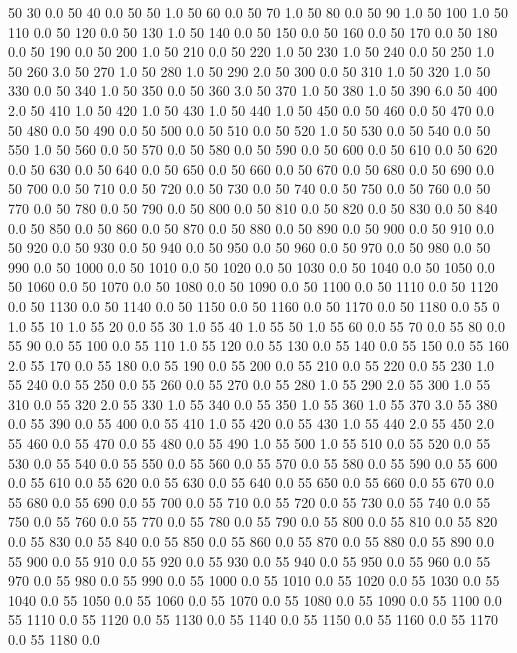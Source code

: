 50	30	0.0
50	40	0.0
50	50	1.0
50	60	0.0
50	70	1.0
50	80	0.0
50	90	1.0
50	100	1.0
50	110	0.0
50	120	0.0
50	130	1.0
50	140	0.0
50	150	0.0
50	160	0.0
50	170	0.0
50	180	0.0
50	190	0.0
50	200	1.0
50	210	0.0
50	220	1.0
50	230	1.0
50	240	0.0
50	250	1.0
50	260	3.0
50	270	1.0
50	280	1.0
50	290	2.0
50	300	0.0
50	310	1.0
50	320	1.0
50	330	0.0
50	340	1.0
50	350	0.0
50	360	3.0
50	370	1.0
50	380	1.0
50	390	6.0
50	400	2.0
50	410	1.0
50	420	1.0
50	430	1.0
50	440	1.0
50	450	0.0
50	460	0.0
50	470	0.0
50	480	0.0
50	490	0.0
50	500	0.0
50	510	0.0
50	520	1.0
50	530	0.0
50	540	0.0
50	550	1.0
50	560	0.0
50	570	0.0
50	580	0.0
50	590	0.0
50	600	0.0
50	610	0.0
50	620	0.0
50	630	0.0
50	640	0.0
50	650	0.0
50	660	0.0
50	670	0.0
50	680	0.0
50	690	0.0
50	700	0.0
50	710	0.0
50	720	0.0
50	730	0.0
50	740	0.0
50	750	0.0
50	760	0.0
50	770	0.0
50	780	0.0
50	790	0.0
50	800	0.0
50	810	0.0
50	820	0.0
50	830	0.0
50	840	0.0
50	850	0.0
50	860	0.0
50	870	0.0
50	880	0.0
50	890	0.0
50	900	0.0
50	910	0.0
50	920	0.0
50	930	0.0
50	940	0.0
50	950	0.0
50	960	0.0
50	970	0.0
50	980	0.0
50	990	0.0
50	1000	0.0
50	1010	0.0
50	1020	0.0
50	1030	0.0
50	1040	0.0
50	1050	0.0
50	1060	0.0
50	1070	0.0
50	1080	0.0
50	1090	0.0
50	1100	0.0
50	1110	0.0
50	1120	0.0
50	1130	0.0
50	1140	0.0
50	1150	0.0
50	1160	0.0
50	1170	0.0
50	1180	0.0
55	0	1.0
55	10	1.0
55	20	0.0
55	30	1.0
55	40	1.0
55	50	1.0
55	60	0.0
55	70	0.0
55	80	0.0
55	90	0.0
55	100	0.0
55	110	1.0
55	120	0.0
55	130	0.0
55	140	0.0
55	150	0.0
55	160	2.0
55	170	0.0
55	180	0.0
55	190	0.0
55	200	0.0
55	210	0.0
55	220	0.0
55	230	1.0
55	240	0.0
55	250	0.0
55	260	0.0
55	270	0.0
55	280	1.0
55	290	2.0
55	300	1.0
55	310	0.0
55	320	2.0
55	330	1.0
55	340	0.0
55	350	1.0
55	360	1.0
55	370	3.0
55	380	0.0
55	390	0.0
55	400	0.0
55	410	1.0
55	420	0.0
55	430	1.0
55	440	2.0
55	450	2.0
55	460	0.0
55	470	0.0
55	480	0.0
55	490	1.0
55	500	1.0
55	510	0.0
55	520	0.0
55	530	0.0
55	540	0.0
55	550	0.0
55	560	0.0
55	570	0.0
55	580	0.0
55	590	0.0
55	600	0.0
55	610	0.0
55	620	0.0
55	630	0.0
55	640	0.0
55	650	0.0
55	660	0.0
55	670	0.0
55	680	0.0
55	690	0.0
55	700	0.0
55	710	0.0
55	720	0.0
55	730	0.0
55	740	0.0
55	750	0.0
55	760	0.0
55	770	0.0
55	780	0.0
55	790	0.0
55	800	0.0
55	810	0.0
55	820	0.0
55	830	0.0
55	840	0.0
55	850	0.0
55	860	0.0
55	870	0.0
55	880	0.0
55	890	0.0
55	900	0.0
55	910	0.0
55	920	0.0
55	930	0.0
55	940	0.0
55	950	0.0
55	960	0.0
55	970	0.0
55	980	0.0
55	990	0.0
55	1000	0.0
55	1010	0.0
55	1020	0.0
55	1030	0.0
55	1040	0.0
55	1050	0.0
55	1060	0.0
55	1070	0.0
55	1080	0.0
55	1090	0.0
55	1100	0.0
55	1110	0.0
55	1120	0.0
55	1130	0.0
55	1140	0.0
55	1150	0.0
55	1160	0.0
55	1170	0.0
55	1180	0.0
